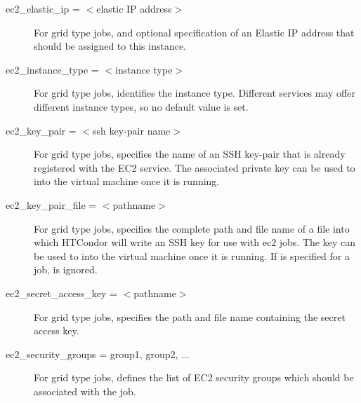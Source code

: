 \begin{description}

\label{condor-submit-ec2-elastic-id}
\item[ec2\_elastic\_ip = $<$elastic IP address$>$]
For grid type  jobs,
and optional specification of an Elastic IP address 
that should be assigned to this instance.


\label{condor-submit-ec2-instance-type}
\item[ec2\_instance\_type = $<$instance type$>$]
For grid type  jobs, identifies the instance type.
Different services may offer different instance types,
so no default value is set.


\item[ec2\_key\_pair = $<$ssh key-pair name$>$]
For grid type  jobs, 
specifies the name of an SSH key-pair that is already registered
with the EC2 service.
The associated private key can be used to  into the
virtual machine once it is running.


\item[ec2\_key\_pair\_file = $<$pathname$>$]
For grid type  jobs, 
specifies the complete path and file name of a file into which 
HTCondor will write an SSH key for use with ec2 jobs. 
The key can be used to  into the
virtual machine once it is running.
If  is specified for a job,
 is ignored.


\label{condor-submit-ec2-access-key}
\item[ec2\_secret\_access\_key = $<$pathname$>$]
For grid type  jobs,
specifies the path and file name containing the secret access key.


\label{condor-submit-ec2-security-groups}
\item[ec2\_security\_groups = group1, group2, ...]
For grid type  jobs, 
defines the list of EC2 security groups which
should be associated with the job.


\end{description}
